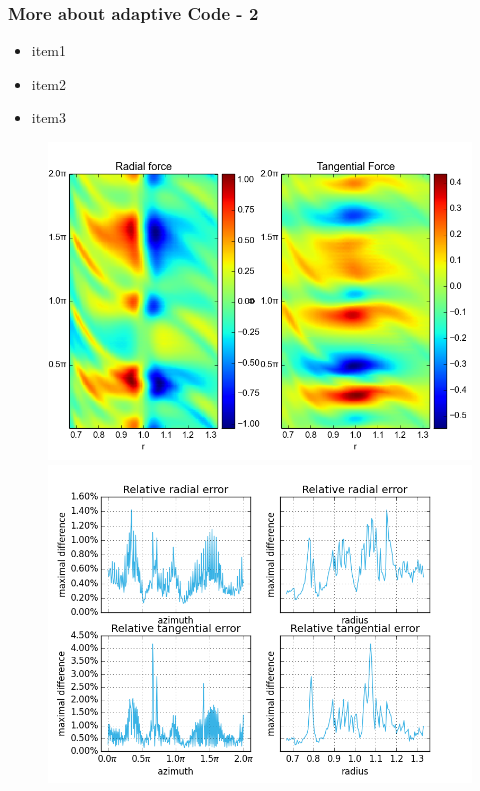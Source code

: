 \documentclass{beamer}
\begin{document}
\begin{frame}
 \frametitle{More about adaptive Code - 2}
\begin{itemize}
  \item item1
  \item item2
  \item item3
 \end{itemize}

 \begin{figure}[H]
  \centering
  \includegraphics[width=.5\textwidth]{../../../Sara/run/default/forcesA-euclid.png}     \includegraphics[width=.5\textwidth]{../../../Sara/run/default/diff_1D.png}
\end{figure}
\end{frame}
\end{document}
